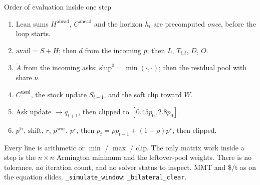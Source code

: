 \begin{frame}{Order of evaluation inside one step}

{\scriptsize
\begin{enumerate}
\item Lean sums $H^{\mathrm{ahead}}$, $C^{\mathrm{ahead}}$ and the horizon
      $h_t$ are precomputed \emph{once}, before the loop starts.
\item $\mathrm{avail}=S+H$; then $d$ from the incoming $p$; then
      $L$, $T_{i,t}$, $D$, $O$.
\item $\tilde A$ from the incoming asks; $\mathrm{ship}^0=\min(\cdot,\cdot)$;
      then the residual pool with share $\nu$.
\item $C^{\mathrm{used}}$, the stock update $S_{t+1}$, and the soft clip
      toward $W$.
\item Ask update $\to q_{t+1}$, then clipped to $[0.45p_0,2.8p_0]$.
\item $p^{\mathrm{tr}}$, $\mathrm{shift}$, $r$, $p^{\mathrm{scar}}$,
      $p^\star$, then $p_t=\rho p_{t-1}+(1-\rho)p^\star$, then clipped.
\end{enumerate}}

Every line is arithmetic or $\min$ / $\max$ / $\mathrm{clip}$. The only
matrix work inside a step is the $n\times n$ Armington minimum and the
leftover-pool weights. There is no tolerance, no iteration count, and no
solver status to inspect.
{MMT and \$/t as on the equation slides.}
{\texttt{\_simulate\_window}; \texttt{\_bilateral\_clear}.}
\end{frame}

